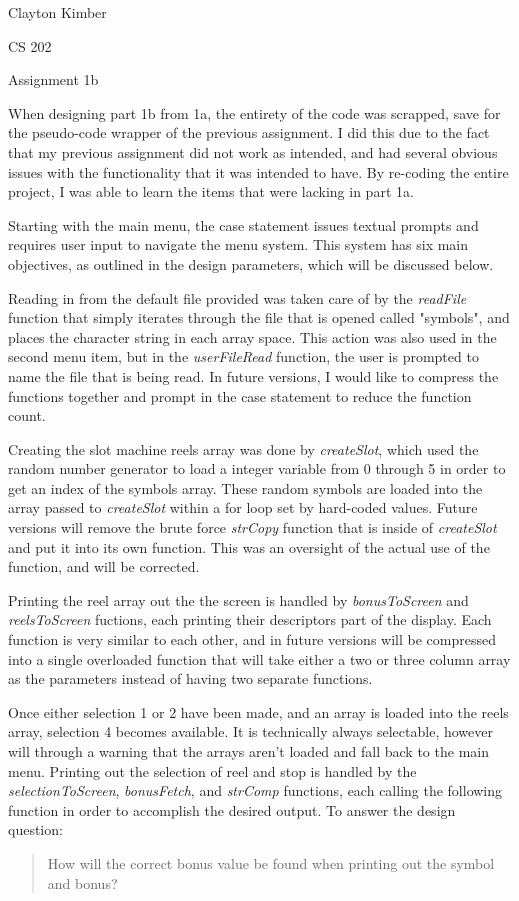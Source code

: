 \documentclass[12pt]{article}
\begin{document}
\begin{flushright}
Clayton Kimber

CS 202

Assignment 1b
\end{flushright}

When designing part 1b from 1a, the entirety of the code was scrapped, save for the pseudo-code wrapper of the previous assignment.  I did this due to the fact that my previous assignment did not work as intended, and had several obvious issues with the functionality that it was intended to have.  By re-coding the entire project, I was able to learn the items that were lacking in part 1a.

Starting with the main menu, the case statement issues textual prompts and requires user input to navigate the menu system.  This system has six main objectives, as outlined in the design parameters, which will be discussed below.

Reading in from the default file provided was taken care of by the \emph{readFile} function that simply iterates through the file that is opened called "symbols", and places the character string in each array space.  This action was also used in the second menu item, but in the \emph{userFileRead} function, the user is prompted to name the file that is being read.  In future versions, I would like to compress the functions together and prompt in the case statement to reduce the function count.

Creating the slot machine reels array was done by \emph{createSlot}, which used the random number generator to load a integer variable from 0 through 5 in order to get an index of the symbols array.  These random symbols are loaded into the array passed to \emph{createSlot} within a for loop set by hard-coded values.  Future versions will remove the brute force \emph{strCopy} function that is inside of \emph{createSlot} and put it into its own function.  This was an oversight of the actual use of the function, and will be corrected.

Printing the reel array out the the screen is handled by \emph{bonusToScreen} and \emph{reelsToScreen} fuctions, each printing their descriptors part of the display.  Each function is very similar to each other, and in future versions will be compressed into a single overloaded function that will take either a two or three column array as the parameters instead of having two separate functions.

Once either selection 1 or 2 have been made, and an array is loaded into the reels array, selection 4 becomes available.  It is technically always selectable, however will through a warning that the arrays aren't loaded and fall back to the main menu.  Printing out the selection of reel and stop is handled by the \emph{selectionToScreen}, \emph{bonusFetch}, and \emph{strComp} functions, each calling the following function in order to accomplish the desired output.  To answer the design question:
\begin{quote}
How will the correct bonus value be found when printing out the symbol and bonus?
\end{quote}
\end{document}
